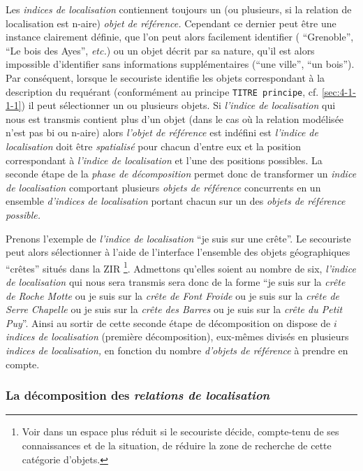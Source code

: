Les \emph{indices de localisation} contiennent toujours un (ou
plusieurs, si la relation de localisation est n-aire) \emph{objet de
  référence.} Cependant ce dernier peut être une instance clairement
définie, que l'on peut alors facilement identifier (\eg
\enquote{Grenoble}, \enquote{Le bois des Ayes}, \emph{etc.}) ou un
objet décrit par sa nature, qu'il est alors impossible d'identifier
sans informations supplémentaires (\eg \enquote{une ville},
\enquote{un bois}). Par conséquent, lorsque le secouriste identifie
les objets correspondant à la description du requérant (conformément
au principe \texttt{TITRE principe}, cf. \ref{sec:4-1-1-1}) il peut
sélectionner un ou plusieurs objets. Si \emph{l'indice de
  localisation} qui nous est transmis contient plus d'un objet (dans
le cas où la relation modélisée n'est pas bi ou n-aire) alors
\emph{l'objet de référence} est indéfini est \emph{l'indice de
  localisation} doit être \emph{spatialisé} pour chacun d'entre eux et
la position correspondant à \emph{l'indice de localisation} et l'une
des positions possibles.  La seconde étape de la \emph{phase de
  décomposition} permet donc de transformer un \emph{indice de
  localisation} comportant plusieurs \emph{objets de référence}
concurrents en un ensemble \emph{d'indices de localisation} portant
chacun sur un des \emph{objets de référence possible.}

Prenons l'exemple de \emph{l'indice de localisation} \enquote{je suis
  sur une crête}. Le secouriste peut alors sélectionner à l'aide de
l'interface l'ensemble des objets géographiques \enquote{crêtes}
situés dans la ZIR \footnote{Voir dans un espace plus réduit si le
  secouriste décide, compte-tenu de ses connaissances et de la
  situation, de réduire la zone de recherche de cette catégorie
  d'objets.}. Admettons qu'elles soient au nombre de six,
\emph{l'indice de localisation} qui nous sera transmis sera donc de la
forme \enquote{je suis sur la \emph{crête de Roche Motte} ou je suis
  sur la \emph{crête de Font Froide} ou je suis sur la \emph{crête de
    Serre Chapelle} ou je suis sur la \emph{crête des Barres} ou je
  suis sur la \emph{crête du Petit Puy}}. Ainsi au sortir de cette
seconde étape de décomposition on dispose de \(i\) \emph{indices de
  localisation} (première décomposition), eux-mêmes divisés en
plusieurs \emph{indices de localisation,} en fonction du nombre
\emph{d'objets de référence} à prendre en compte.

\subsubsection{La décomposition des \emph{relations de localisation}}

